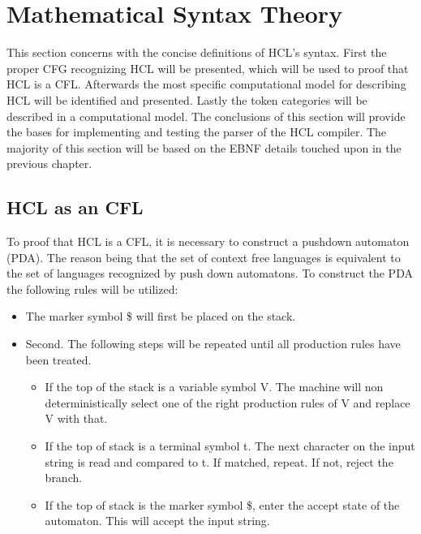 \section{Mathematical Syntax Theory}
This section concerns with the concise definitions of HCL's syntax. First the proper CFG recognizing HCL will be presented, which will be used to proof that HCL is a CFL. Afterwards the most specific computational model for describing HCL will be identified and presented. Lastly the token categories will be described in a computational model. The conclusions of this section will provide the bases for implementing and testing the parser of the HCL compiler. The majority of this section will be based on the EBNF details touched upon in the previous chapter.

\subsection{HCL as an CFL}

To proof that HCL is a CFL, it is necessary to construct a pushdown automaton (PDA).
The reason being that the set of context free languages is equivalent to the set of languages recognized by push down automatons.
To construct the PDA the following rules will be utilized:
\begin{center}
	\begin{itemize}
		\item The marker symbol \$ will first be placed on the stack.
		\item Second. The following steps will be repeated until all production rules have been treated.
		\begin{itemize}
			\item If the top of the stack is a variable symbol V. The machine will non deterministically select one of the right production rules of V and replace V with that.
			\item If the top of stack is a terminal symbol t. The next character on the input string is read and compared to t. If matched, repeat. If not, reject the branch.
			\item If the top of stack is the marker symbol \$, enter the accept state of the automaton. This will accept the input string.
		\end{itemize}
	\end{itemize}
\end{center}

